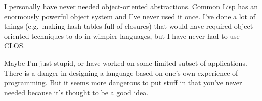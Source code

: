 I personally have never needed object-oriented abstractions. Common Lisp
has an enormously powerful object system and I've never used it once.
I've done a lot of things (e.g.~making hash tables full of closures)
that would have required object-oriented techniques to do in wimpier
languages, but I have never had to use CLOS.

Maybe I'm just stupid, or have worked on some limited subset of
applications. There is a danger in designing a language based on one's
own experience of programming. But it seems more dangerous to put stuff
in that you've never needed because it's thought to be a good idea.